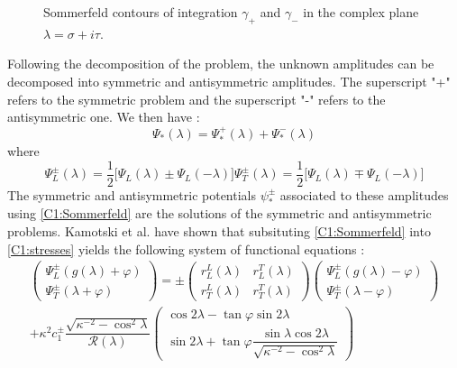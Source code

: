 \begin{figure}
\label{C1:Somcontours}
\caption{Sommerfeld contours of integration $\gamma_+$ and $\gamma_-$ in the complex plane $\lambda=\sigma+i\tau$.}
\end{figure}

Following the decomposition of the problem, the unknown amplitudes can be decomposed into symmetric and antisymmetric amplitudes. The superscript "+" refers to the symmetric problem and the superscript "-" refers to the antisymmetric one. We then have :
\begin{equation}
\Psi_*(\lambda)=\Psi_*^+(\lambda)+\Psi_*^-(\lambda)
\end{equation}
where
\begin{subequations}
\begin{equation}
\Psi_L^\pm(\lambda)=\frac{1}{2}\lbrack\Psi_L(\lambda)\pm\Psi_L(-\lambda)\rbrack
\end{equation}
\begin{equation}
\Psi_T^\pm(\lambda)=\frac{1}{2}\lbrack\Psi_L(\lambda)\mp\Psi_L(-\lambda)\rbrack
\end{equation}
\end{subequations}
The symmetric and antisymmetric potentials $\psi_*^\pm$ associated to these amplitudes using \eqref{C1:Sommerfeld} are the solutions of the symmetric and antisymmetric problems. Kamotski et al. \cite{KamotskiFradkin} have shown that subsituting \eqref{C1:Sommerfeld} into \eqref{C1:stresses} yields the following system of functional equations :
\begin{multline}
\begin{pmatrix}
\Psi_L^\pm(g(\lambda)+\varphi)\\
\Psi_T^\pm(\lambda+\varphi)
\end{pmatrix}
=\pm\begin{pmatrix}
r_L^L(\lambda)&r_L^T(\lambda)\\
r_T^L(\lambda)&r_T^T(\lambda)
\end{pmatrix} 
\begin{pmatrix}
\Psi_L^\pm(g(\lambda)-\varphi)\\
\Psi_T^\pm(\lambda-\varphi)
\end{pmatrix} \\
+\kappa^2 c_1^\pm\dfrac{\sqrt{\kappa^{-2}-\cos^2\lambda}}{\mathcal{R}(\lambda)} \begin{pmatrix}
\cos 2\lambda-\tan\varphi\sin 2\lambda \\
\sin 2\lambda+\tan\varphi\dfrac{\sin\lambda\cos 2\lambda}{\sqrt{\kappa^{-2}-\cos^2\lambda}}
\end{pmatrix}
\label{C1:SIfunctional}
\end{multline}
